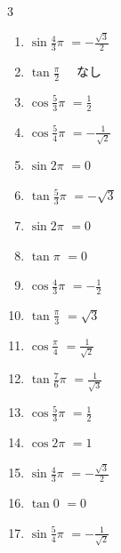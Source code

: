 \begin{multicols}{3}
\begin{enumerate}
  \item $\displaystyle \sin{\frac{4}{3}\pi}$
        $\displaystyle =-\frac{\sqrt{3}}{2}$

  \item $\displaystyle \tan{\frac{\pi}{2}}$
        $\displaystyle \quad なし$

  \item $\displaystyle \cos{\frac{5}{3}\pi}$
        $\displaystyle =\frac{1}{2}$

  \item $\displaystyle \cos{\frac{5}{4}\pi}$
        $\displaystyle =-\frac{1}{\sqrt{2}}$

  \item $\displaystyle \sin{2\pi}$
        $\displaystyle =0$

  \item $\displaystyle \tan{\frac{5}{3}\pi}$
        $\displaystyle =-\sqrt{3}$

  \item $\displaystyle \sin{2\pi}$
        $\displaystyle =0$

  \item $\displaystyle \tan{\pi}$
        $\displaystyle =0$

  \item $\displaystyle \cos{\frac{4}{3}\pi}$
        $\displaystyle =-\frac{1}{2}$

  \item $\displaystyle \tan{\frac{\pi}{3}}$
        $\displaystyle =\sqrt{3}$

  \item $\displaystyle \cos{\frac{\pi}{4}}$
        $\displaystyle =\frac{1}{\sqrt{2}}$

  \item $\displaystyle \tan{\frac{7}{6}\pi}$
        $\displaystyle =\frac{1}{\sqrt{3}}$

  \item $\displaystyle \cos{\frac{5}{3}\pi}$
        $\displaystyle =\frac{1}{2}$

\columnbreak %

  \item $\displaystyle \cos{2\pi}$
        $\displaystyle =1$

  \item $\displaystyle \sin{\frac{4}{3}\pi}$
        $\displaystyle =-\frac{\sqrt{3}}{2}$

  \item $\displaystyle \tan{0}$
        $\displaystyle =0$

  \item $\displaystyle \sin{\frac{5}{4}\pi}$
        $\displaystyle =-\frac{1}{\sqrt{2}}$


\end{enumerate}
\end{multicols}
